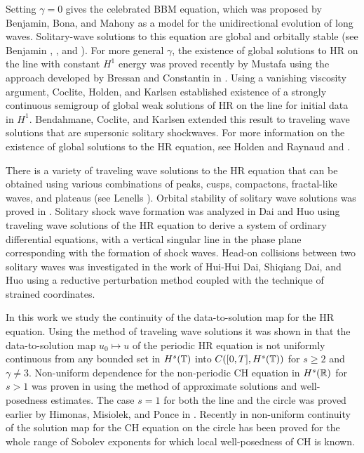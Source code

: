 Setting $\gamma = 0$ gives the celebrated 
BBM equation, which was proposed by 
Benjamin, Bona, and Mahony 
\cite{Benjamin_1972_Model-equations} as a model for 
the unidirectional evolution of long waves.
Solitary-wave solutions to this 
equation are global and orbitally stable (see Benjamin 
\cite{Benjamin_1972_The-stability-o}, 
\cite{Benjamin_1972_Model-equations}, and 
\cite{Constantin_2000_Stability-of-a-}).
For more general $\gamma$, the existence of global 
solutions to HR on the line with constant $H^1$ energy
was proved recently by Mustafa \cite{Mustafa_2007_Global-conserva}
using the approach developed by Bressan and 
Constantin in \cite{Bressan_2007_Global-conserva}. Using a vanishing 
viscosity argument, Coclite, 
Holden, and Karlsen \cite{Coclite_2005_Global-weak-sol}
established existence of a strongly continuous semigroup of global 
weak solutions of HR on the line for initial data in $H^1$.
Bendahmane, Coclite, and Karlsen 
\cite{Bendahmane_2006_Hsp-1-perturbat} extended this result to traveling 
wave solutions that are supersonic solitary shockwaves.
For more information on the existence of global solutions to the HR
equation, see Holden and Raynaud \cite{Holden_2007_Global-conserva}
and \cite{Yin_2003_On-the-Cauchy-p}. 

There is a variety of traveling wave solutions to the HR equation that can be 
obtained using various combinations of peaks, cusps, compactons, 
fractal-like waves, and plateaus (see Lenells 
\cite{Lenells_2006_Traveling-waves}). Orbital stability of solitary wave 
solutions was proved in \cite{Constantin_2000_Stability-of-a-}.
Solitary shock wave formation was 
analyzed in Dai and Huo \cite{Dai_2000_Solitary-shock-} using traveling 
wave solutions of the HR equation to derive a system of ordinary differential 
equations, with a vertical singular line in the phase plane corresponding with the 
formation of shock waves. Head-on collisions between two solitary 
waves was investigated in the work of Hui-Hui Dai, 
Shiqiang Dai, and Huo \cite{Dai_2000_Head-on-collisi} using a reductive 
perturbation method coupled with the technique of strained coordinates. 

In this work we study the continuity of the data-to-solution map for the HR 
equation.
Using the method of traveling wave solutions it was shown in  
\cite{Olson_2006_Non-uniform-dep} that the data-to-solution map
$u_0  \mapsto u$ of the periodic HR equation is not uniformly continuous 
from any bounded set in $H^s(\mathbb{T})$ into $C([0, T ], H^s(\mathbb{T}))$ for $s \ge 
2$ and $\gamma \neq 3$. Non-uniform dependence for the non-periodic CH 
equation in 
$H^s(\mathbb{R})$ for $s>1$ was proven in \cite{Himonas:2009fk} 
using the method of approximate solutions and well-posedness estimates. The 
case $s=1$ for both the line and the circle
 was proved earlier by Himonas, Misiolek, and Ponce in 
 \cite{Himonas_2007_Non-uniform-con}.
 Recently  in \cite{Himonas_2009_Non-uniform-dep-per} non-uniform 
 continuity of the solution map for the CH equation
 on the circle has been proved
 for the whole range of Sobolev exponents for which local well-posedness of 
 CH is known.
 
